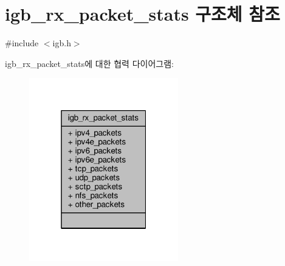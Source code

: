 \hypertarget{structigb__rx__packet__stats}{}\section{igb\+\_\+rx\+\_\+packet\+\_\+stats 구조체 참조}
\label{structigb__rx__packet__stats}


{\ttfamily \#include $<$igb.\+h$>$}



igb\+\_\+rx\+\_\+packet\+\_\+stats에 대한 협력 다이어그램\+:
\nopagebreak
\begin{figure}[H]
\begin{center}
\leavevmode
\includegraphics[width=184pt]{structigb__rx__packet__stats__coll__graph}
\end{center}
\end{figure}

